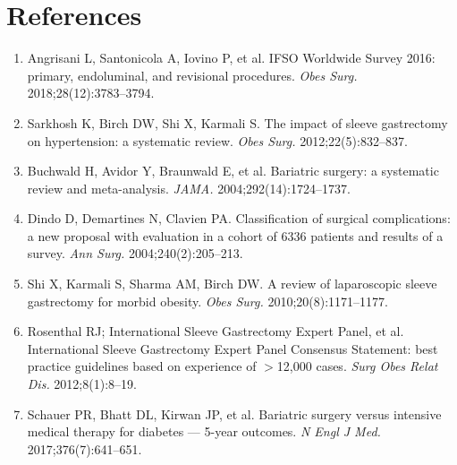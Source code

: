 \documentclass[11pt,a4paper]{article}
\begin{document}
\section{References}

\begin{enumerate}[leftmargin=20pt, itemsep=2pt, label={\color{SurgBlue}\arabic*.}]
  \small
  \item Angrisani L, Santonicola A, Iovino P, et al.
    IFSO Worldwide Survey 2016: primary, endoluminal, and revisional procedures.
    \textit{Obes Surg.} 2018;28(12):3783--3794.
  \item Sarkhosh K, Birch DW, Shi X, Karmali S.
    The impact of sleeve gastrectomy on hypertension: a systematic review.
    \textit{Obes Surg.} 2012;22(5):832--837.
  \item Buchwald H, Avidor Y, Braunwald E, et al.
    Bariatric surgery: a systematic review and meta-analysis.
    \textit{JAMA.} 2004;292(14):1724--1737.
  \item Dindo D, Demartines N, Clavien PA.
    Classification of surgical complications: a new proposal with evaluation
    in a cohort of 6336 patients and results of a survey.
    \textit{Ann Surg.} 2004;240(2):205--213.
  \item Shi X, Karmali S, Sharma AM, Birch DW.
    A review of laparoscopic sleeve gastrectomy for morbid obesity.
    \textit{Obes Surg.} 2010;20(8):1171--1177.
  \item Rosenthal RJ; International Sleeve Gastrectomy Expert Panel, et al.
    International Sleeve Gastrectomy Expert Panel Consensus Statement:
    best practice guidelines based on experience of $>$12{,}000 cases.
    \textit{Surg Obes Relat Dis.} 2012;8(1):8--19.
  \item Schauer PR, Bhatt DL, Kirwan JP, et al.
    Bariatric surgery versus intensive medical therapy for diabetes ---
    5-year outcomes.
    \textit{N Engl J Med.} 2017;376(7):641--651.
\end{enumerate}

\vspace{10pt}

\end{document}
